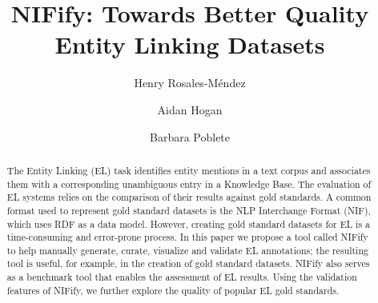 \documentclass[sigconf]{acmart}
\begin{document}
%
\title{NIFify: Towards Better Quality Entity Linking Datasets}

%
\author{Henry Rosales-M\'endez}

\author{Aidan Hogan}


\author{Barbara Poblete}




%
\renewcommand{\shortauthors}{Rosales-M\'endez et al.}

%
\begin{abstract}
The Entity Linking (EL) task identifies entity mentions in a text corpus and associates them with a corresponding unambiguous entry in a Knowledge Base. The evaluation of EL systems relies on the comparison of their results against gold standards. A common format used to represent gold standard datasets is the NLP Interchange Format (NIF), which uses RDF as a data model. However, creating gold standard datasets for EL is a time-consuming and error-prone process. In this paper we propose a tool called NIFify to help manually generate, curate, visualize and validate EL annotations; the resulting tool is useful, for example, in the creation of gold standard datasets. NIFify also serves as a benchmark tool that enables the assessment of EL results. Using the validation features of NIFify, we further explore the quality of popular EL gold standards. 
\end{abstract}
\end{document}
